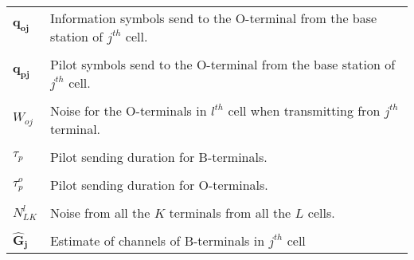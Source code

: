 \documentclass[10pt, a4paper, twoside,fleqn]{article}
\begin{document}
\begin{appendices}
\begin{flushleft}
\begin{tabular}{ll}
	$\mathbf{q_{oj}}$                 & Information symbols send to the O-terminal from the base station of $j^{th}$ cell.\\ \\
	$\mathbf{q_{pj}}$                 & Pilot symbols send to the O-terminal from the base station of $j^{th}$ cell.\\ \\
	$W_{oj}$                          & Noise for the O-terminals in $l^{th}$ cell when transmitting fron $j^{th}$ terminal. \\ \\
        $\tau_{p}$                        & Pilot sending duration for B-terminals.\\ \\
        $\tau_{p}^{o}$                    & Pilot sending duration for O-terminals.\\ \\
        $N_{LK}^{l}$                      & Noise from all the $K$ terminals from all the $L$ cells.\\ \\
	$\mathbf{\hat G_j}$               & Estimate of channels of B-terminals in $j^{th}$ cell
\end{tabular}
\end{flushleft}
\end{appendices}

{}

\enddocument
\end{document}
